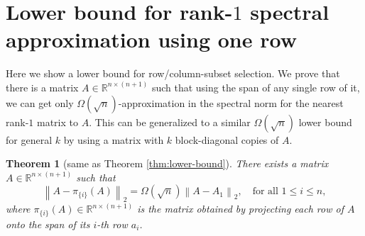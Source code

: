 \documentclass[11pt]{article}
\newtheorem{theorem}{Theorem}
\def\reals{\mathbb{R}}
\newcommand{\norm}[1]{\left\|#1\right\|}
\begin{document}
\section{Lower bound for rank-$1$ spectral approximation using one row}
Here we show a lower bound for row/column-subset selection. We prove that there is a matrix $A \in \reals^{n \times (n+1)}$ such that using the span of any single row of it, we can get only $\Omega(\sqrt{n})$-approximation in the spectral norm for the nearest rank-$1$ matrix to $A$. This can be generalized to a similar $\Omega(\sqrt{n})$ lower bound for general $k$ by using a matrix with $k$ block-diagonal copies of $A$.

\begin{theorem}[same as Theorem \ref{thm:lower-bound}]
There exists a matrix $A \in \reals^{n \times (n+1)}$ such that
\[
\norm{A - \pi_{\{i\}}(A)}_{2} = \Omega(\sqrt{n}) \norm{A - A_{1}}_{2}, \quad \text{for all $1 \leq i \leq n$},
\]
where $\pi_{\{i\}}(A) \in \reals^{n \times (n+1)}$ is the matrix obtained by projecting each row of $A$ onto the span of its $i$-th row $a_{i}$.
\end{theorem}
\end{document}

